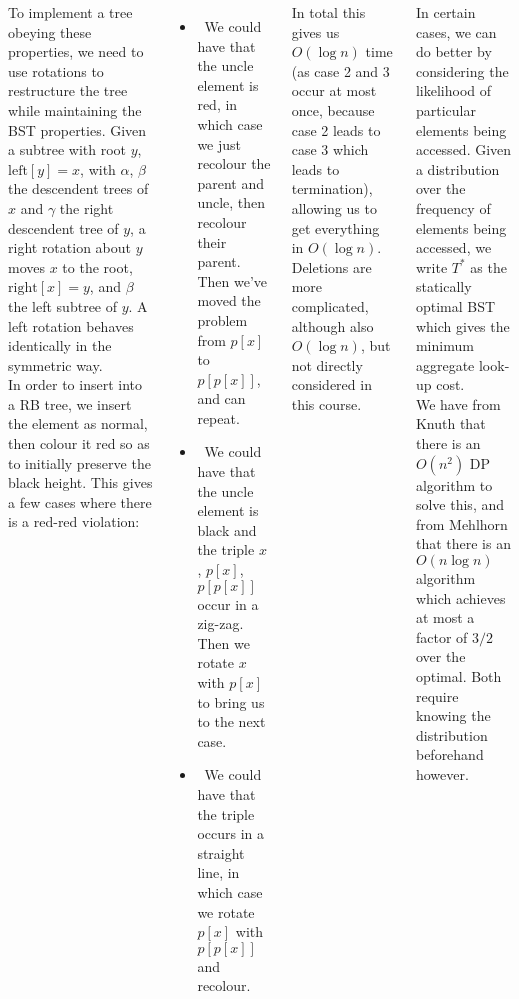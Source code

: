 \documentclass{tikzposter} %
\begin{document}
\begin{columns}
{{   To implement a tree obeying these properties, we need to use rotations to restructure the tree while maintaining the BST properties. Given a subtree with root $y$, $\mathrm{left}[y] = x$, with $\alpha$, $\beta$ the descendent trees of $x$ and $\gamma$ the right descendent tree of $y$, a right rotation about $y$ moves $x$ to the root, $\mathrm{right}[x] = y$, and $\beta$ the left subtree of $y$. A left rotation behaves identically in the symmetric way. \\

   In order to insert into a RB tree, we insert the element as normal, then colour it red so as to initially preserve the black height. This gives a few cases where there is a red-red violation:
   \begin{itemize}
           \item \ We could have that the uncle element is red, in which case we just recolour the parent and uncle, then recolour their parent. Then we've moved the problem from $p[x]$ to $p[p[x]]$, and can repeat.
           \item \ We could have that the uncle element is black and the triple $x$, $p[x]$, $p[p[x]]$ occur in a zig-zag. Then we rotate $x$ with $p[x]$ to bring us to the next case.
           \item \ We could have that the triple occurs in a straight line, in which case we rotate $p[x]$ with $p[p[x]]$ and recolour. \\
   \end{itemize}

   In total this gives us $O(\log n)$ time (as case 2 and 3 occur at most once, because case 2 leads to case 3 which leads to termination), allowing us to get everything in $O(\log n)$. Deletions are more complicated, although also $O(\log n)$, but not directly considered in this course.
   }
   \hphantom{}

   In certain cases, we can do better by considering the likelihood of particular elements being accessed. Given a distribution over the frequency of elements being accessed, we write $T^{*}$ as the statically optimal BST which gives the minimum aggregate look-up cost. \\

   We have from Knuth that there is an $O(n^{2})$ DP algorithm to solve this, and from Mehlhorn that there is an $O(n \log n)$ algorithm which achieves at most a factor of $3/2$ over the optimal. Both require knowing the distribution beforehand however. \\

}
\end{columns}
\end{document}
